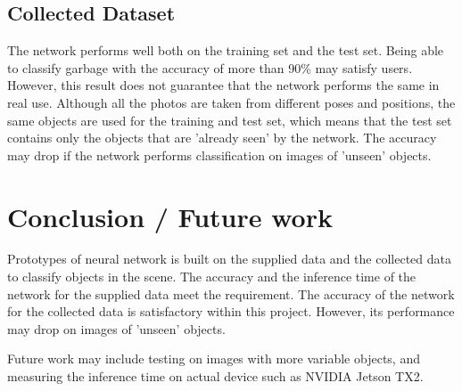\documentclass[10pt,journal,compsoc]{IEEEtran}
\begin{document}
\subsection{Collected Dataset}
The network performs well both on the training set and the test set. Being able to classify garbage with the accuracy of more than 90\% may satisfy users.  However, this result does not guarantee that the network performs the same in real use. Although all the photos are taken from different poses and positions, the same objects are used for the training and test set, which means that the test set contains only the objects that are 'already seen' by the network. The accuracy may drop if the network performs classification on images of 'unseen' objects.

\section{Conclusion / Future work}
Prototypes of neural network is built on the supplied data and the collected data to classify objects in the scene. The accuracy and the inference time of the network for the supplied data meet the requirement. The accuracy of the network for the collected data is satisfactory within this project. However, its performance may drop on images of 'unseen' objects.

Future work may include testing on images with more variable objects, and measuring the inference time on actual device such as NVIDIA Jetson TX2.



\end{document}
